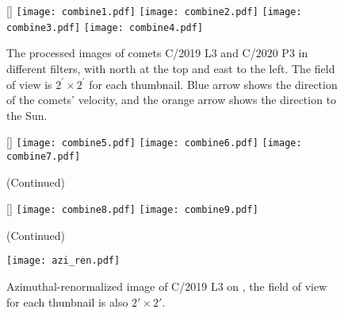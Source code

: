 \begin{figure}
    \centering
    [\linewidth]{
        \texttt{[image: combine1.pdf]}
        \texttt{[image: combine2.pdf]} 
        \texttt{[image: combine3.pdf]}
        \texttt{[image: combine4.pdf]}
    }
    \caption{The processed images of comets C/2019 L3  and C/2020 P3  in different filters, with north at the top and east to the left. The field of view is $ 2^{\prime} \times 2^{\prime} $ for each thumbnail. Blue arrow shows the direction of the comets' velocity, and the orange arrow shows the direction to the Sun. }
    \label{fig:combinedimg}
\end{figure}

\begin{figure}
    \centering
    \ContinuedFloat
    [\linewidth]{
        \texttt{[image: combine5.pdf]}
        \texttt{[image: combine6.pdf]} 
        \texttt{[image: combine7.pdf]} 
    }
    \caption{(Continued)}
\end{figure}

\begin{figure}
    \centering
    \ContinuedFloat
    [\linewidth]{
        \texttt{[image: combine8.pdf]}
        \texttt{[image: combine9.pdf]} 
    }
    \caption{(Continued)}
\end{figure}

\begin{figure}
    \centering
    \texttt{[image: azi\_ren.pdf]}
    \caption{Azimuthal-renormalized image of C/2019 L3  on , the field of view for each thunbnail is also $\ang{;2;}\times\ang{;2;}$. \label{fig:aziren}}
\end{figure}
    
